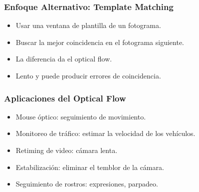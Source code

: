 \begin{frame}
  \frametitle{Enfoque Alternativo: Template Matching}
  \begin{itemize}
    \item Usar una ventana de plantilla de un fotograma.
    \item Buscar la mejor coincidencia en el fotograma siguiente.
    \item La diferencia da el optical flow.
    \item Lento y puede producir errores de coincidencia.
  \end{itemize}

\end{frame}

\begin{frame}
  \frametitle{Aplicaciones del Optical Flow}
  \begin{itemize}
    \item Mouse óptico: seguimiento de movimiento.
    \item Monitoreo de tráfico: estimar la velocidad de los vehículos.
    \item Retiming de video: cámara lenta.
    \item Estabilización: eliminar el temblor de la cámara.
    \item Seguimiento de rostros: expresiones, parpadeo.
  \end{itemize}
\end{frame}

